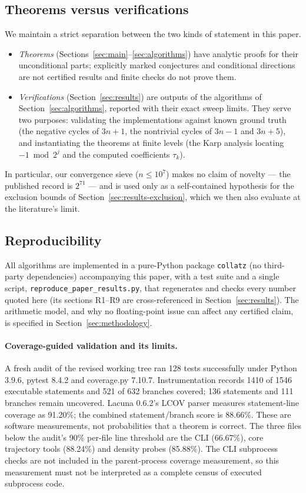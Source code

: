\documentclass[11pt]{amsart}
\theoremstyle{definition}
\theoremstyle{remark}
\begin{document}
\subsection{Theorems versus verifications}\label{sec:sep}

We maintain a strict separation between the two kinds of statement in this paper.
\begin{itemize}
\item \emph{Theorems} (Sections~\ref{sec:main}--\ref{sec:algorithms}) have analytic proofs for their unconditional parts; explicitly marked conjectures and conditional directions are not certified results and finite checks do not prove them.
\item \emph{Verifications} (Section~\ref{sec:results}) are outputs of the algorithms of Section~\ref{sec:algorithms}, reported with their exact sweep limits. They serve two purposes: validating the implementations against known ground truth (the negative cycles of $3n+1$, the nontrivial cycles of $3n-1$ and $3n+5$), and instantiating the theorems at finite levels (the Karp analysis locating $-1 \bmod 2^j$ and the computed coefficients $\tau_k$).
\end{itemize}
In particular, our convergence sieve ($n \le 10^7$) makes no claim of novelty --- the published record is $2^{71}$ \cite{barina2025} --- and is used only as a self-contained hypothesis for the exclusion bounds of Section~\ref{sec:results-exclusion}, which we then also evaluate at the literature's limit.

\subsection{Reproducibility}\label{sec:repro}

All algorithms are implemented in a pure-Python package \texttt{collatz} (no third-party dependencies) accompanying this paper, with a test suite and a single script, \texttt{reproduce\_paper\_results.py}, that regenerates and checks every number quoted here (its sections R1--R9 are cross-referenced in Section~\ref{sec:results}). The arithmetic model, and why no floating-point issue can affect any certified claim, is specified in Section~\ref{sec:methodology}.

\paragraph{Coverage-guided validation and its limits.}
A fresh audit of the revised working tree ran 128 tests successfully under
Python 3.9.6, pytest 8.4.2 and coverage.py 7.10.7. Instrumentation records
1410 of 1546 executable statements and 521 of 632 branches covered;
136 statements and 111 branches remain uncovered. Lacuna 0.6.2's LCOV
parser measures statement-line coverage as 91.20\%; the combined
statement/branch score is 88.66\%. These are software measurements, not
probabilities that a theorem is correct. The three files below the audit's
90\% per-file line threshold are the CLI (66.67\%), core trajectory tools
(88.24\%) and density probes (85.88\%). The CLI subprocess checks are not
included in the parent-process coverage measurement, so this measurement
must not be interpreted as a complete census of executed subprocess code.
\end{document}
